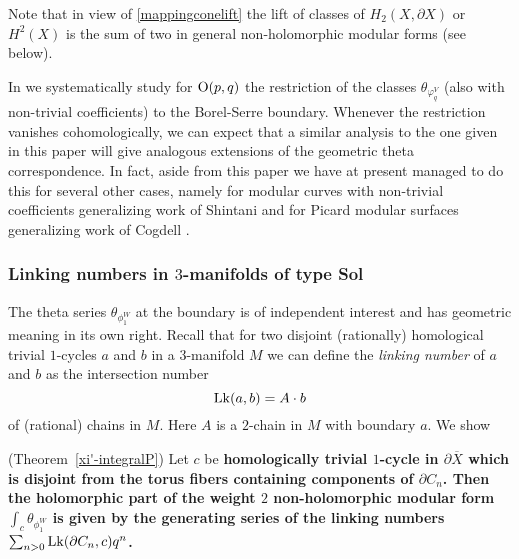 Note that in view of \eqref{mappingconelift} the lift of classes
of $H_2({X}, \partial {X})$ or $H^2(X)$ is the sum of two in general
non-holomorphic modular forms (see below).

In \cite{FMres} we systematically study for $\operatorname{O}(p,q)$ the
restriction of the classes $\theta_{\varphi^V_{q}}$ (also with
non-trivial coefficients) to the Borel-Serre boundary. Whenever the
restriction vanishes cohomologically, we can expect that a similar
analysis to the one given in this paper will give analogous extensions
of the geometric theta correspondence. In fact, aside from this
paper we have at present managed to do this for several other cases,
namely for modular curves with non-trivial coefficients \cite{FMspec}
generalizing work of Shintani \cite{Shintani} and for Picard modular
surfaces \cite{FM-Cogdell} generalizing work of Cogdell \cite{Cogdell}.



\subsubsection*{Linking numbers in $3$-manifolds of type Sol}

The theta series $\theta_{\phi_1^W}$ at the boundary is of independent
interest and has geometric meaning in its own right. Recall that
for two disjoint (rationally) homological trivial $1$-cycles $a$
and $b$ in a $3$-manifold $M$ we can define the {\it linking number}
of $a$ and $b$ as the intersection number
\[
\operatorname{Lk}(a,b) = A \cdot b
\]
of (rational) chains in $M$. Here $A$ is a $2$-chain in $M$ with boundary $a$. We show 

\begin{theorem}\label{FM-linking} (Theorem~\ref{xi'-integralP})
Let $c$ be \bf{homologically} trivial $1$-cycle in $\partial \overline{X}$ which
is disjoint from the torus fibers containing components of $\partial
C_n$. Then the holomorphic part of the weight $2$ non-holomorphic
modular form $\int_c \theta_{\phi_1^W}$ is given by the generating
series of the linking numbers $\sum_{n>0}\operatorname{Lk}(\partial C_n,c) q^n$.
\end{theorem}
